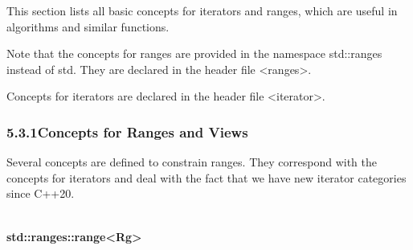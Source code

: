 
This section lists all basic concepts for iterators and ranges, which are useful in algorithms and similar functions.

Note that the concepts for ranges are provided in the namespace std::ranges instead of std. They are declared in the header file <ranges>.

Concepts for iterators are declared in the header file <iterator>.


\subsubsection*{ 5.3.1\hspace{0.2cm}Concepts for Ranges and Views}

Several concepts are defined to constrain ranges. They correspond with the concepts for iterators and deal with the fact that we have new iterator categories since C++20.

\noindent
\hspace*{\fill} \\ %
\textbf{std::ranges::range<Rg>}

